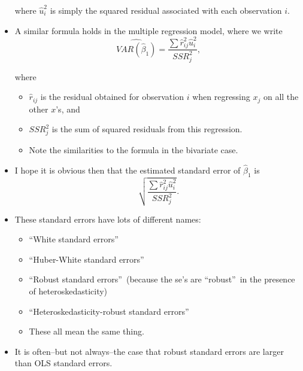 \documentclass[11pt]{article}
\begin{document}
\begin{itemize}
where $\widehat{u}_{i}^{2}$ is simply the squared residual associated with
each observation $i$. \ 

\item A similar formula holds in the multiple regression model, where we
write%
\begin{equation*}
\widehat{VAR\left( \widehat{\beta }_{1}\right) }=\frac{\sum \widehat{r}%
_{ij}^{2}\widehat{u}_{i}^{2}}{SSR_{j}^{2}},
\end{equation*}

where

\begin{itemize}
\item $\widehat{r}_{ij}$ is the residual obtained for observation $i$ when
regressing $x_{j}$ on all the other $x$'s, and

\item $SSR_{j}^{2}$ is the sum of squared residuals from this regression.

\item Note the similarities to the formula in the bivariate case.
\end{itemize}

\item I hope it is obvious then that the estimated standard error of $%
\widehat{\beta }_{1}$ is 
\begin{equation*}
\sqrt{\frac{\sum \widehat{r}_{ij}^{2}\widehat{u}_{i}^{2}}{SSR_{j}^{2}}}.
\end{equation*}

\item These standard errors have lots of different names:

\begin{itemize}
\item \textquotedblleft White standard errors\textquotedblright

\item \textquotedblleft Huber-White standard errors\textquotedblright

\item \textquotedblleft Robust standard errors\textquotedblright\ (because
the se's are \textquotedblleft robust\textquotedblright\ in the presence of
heteroskedasticity)

\item \textquotedblleft Heteroskedasticity-robust standard
errors\textquotedblright

\item These all mean the same thing.
\end{itemize}

\item It is often--but not always--the case that robust standard errors are
larger than OLS standard errors. \ 
\end{itemize}
\end{document}

